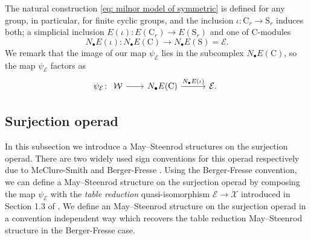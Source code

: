\begin{remark}
	The natural construction \eqref{eq: milnor model of symmetric} is defined for any group, in particular, for finite cyclic groups, and the inclusion $\iota \colon \mathrm C_r \to \mathrm S_r$ induces both; a simplicial inclusion $E(\iota) \colon E(\mathrm C_r) \to E(\mathrm S_r)$ and one of $\mathrm C$-modules
	\begin{equation*}
	N_\bullet E(\iota) \colon N_\bullet E(\mathrm C) \to N_\bullet E(\mathrm S) = \mathcal E.
	\end{equation*}
	We remark that the image of our map $\psi_{\mathcal E}$ lies in the subcomplex $N_\bullet E(\mathrm C)$, so the map $\psi_{\mathcal E}$ factors as
	\begin{equation*}
	\psi_{\mathcal E} \colon
	\begin{tikzcd}
	\mathcal W \arrow[r] &[-3pt] N_\bullet E(\mathrm C) \arrow[r, "N_\bullet E(\iota)"] &[5pt] \mathcal E.
	\end{tikzcd}
	\end{equation*}
\end{remark}

\subsection{Surjection operad}

In this subsection we introduce a May--Steenrod structures on the surjection operad.
There are two widely used sign conventions for this operad respectively due to McClure-Smith \cite{mcclure03cochain} and Berger-Fresse \cite{berger04combinatorial}.
Using the Berger-Fresse convention, we can define a May--Steenrod structure on the surjection operad by composing the map $\psi_{\mathcal E}$ with the \textit{table reduction} quasi-isomorphism $\mathcal E \to \mathcal X$ introduced in Section 1.3 of \cite{berger04combinatorial}.
We define an May--Steenrod structure on the surjection operad in a convention independent way which recovers the table reduction May--Steenrod structure in the Berger-Fresse case.

